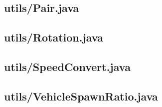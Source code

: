\subsection{utils/Pair.java}

\newpage
\subsection{utils/Rotation.java}

\newpage
\subsection{utils/SpeedConvert.java}

\newpage
\subsection{utils/VehicleSpawnRatio.java}

